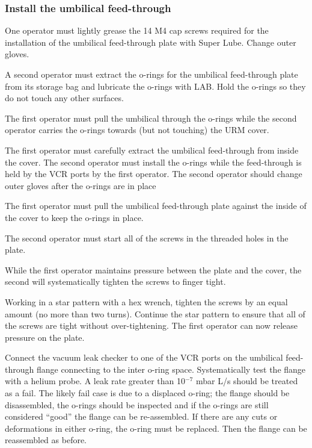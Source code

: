 \documentclass[11pt]{article}
\begin{document}
\subsubsection{Install the umbilical feed-through}
\begin{answerlist}
\item One operator must lightly grease the 14 M4 cap screws required for the
  installation of the umbilical feed-through plate with Super
  Lube. Change outer gloves.
\item A second operator must extract the o-rings for the umbilical
  feed-through plate from its storage bag and lubricate the o-rings
  with LAB. Hold the o-rings so they do not touch any other surfaces. 
\item The first operator must pull the umbilical through the o-rings
  while the second operator carries the o-rings towards (but not
  touching) the URM cover. 
\item The first operator must carefully extract the umbilical
  feed-through from inside the cover. The second operator must install
  the o-rings while the feed-through is held by the VCR ports by the
  first operator. The second operator should change outer gloves after
  the o-rings are in place
\item The first operator must pull the umbilical feed-through plate
  against the inside of the cover to keep the o-rings in place.
\item The second operator must
  start all of the screws in the threaded holes in the plate.
\item While the first operator maintains pressure between the plate
  and the cover, the second will systematically tighten the screws to
  finger tight.
\item Working in a star pattern with a hex wrench, tighten the screws
  by an equal amount (no more than two turns). Continue the star
  pattern to ensure that all of the screws are tight without
  over-tightening. The first operator can now release pressure on the
  plate.
\item Connect the vacuum leak checker to one of the VCR ports on the
  umbilical feed-through flange connecting to the inter o-ring
  space. Systematically test the flange with a helium probe. A leak
  rate greater than 10$^{-7}$ mbar L/s should be treated as a
  fail. The likely fail case is due to a displaced o-ring; the flange
  should be disassembled, the o-rings should be inspected and if the
  o-rings are still considered ``good'' the flange can be
  re-assembled. If there are any cuts or deformations in either
  o-ring, the o-ring must be replaced. Then the flange can be
  reassembled as before.
\end{answerlist}
\end{document}
